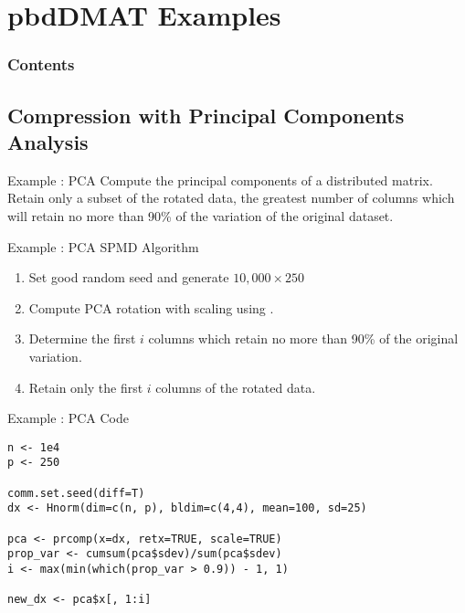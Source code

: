 \section[pbdDMAT Eg's]{pbdDMAT Examples}

\hidenum
\begin{frame}[noframenumbering]
\frametitle{Contents}
 \tableofcontents[currentsection,hideothersubsections,sectionstyle=show/hide]
\end{frame}
\shownum

\subsection{Compression with Principal Components Analysis}

\setcounter{excount}{0}

\begin{frame}
  \begin{block}{Example \countex :  PCA}\pause
    Compute the principal components of a distributed matrix.  Retain only a subset of the rotated data, the greatest number of columns which will retain no more than 90\% of the variation of the original dataset.
  \end{block}
\end{frame}

\begin{frame}[fragile]
  \begin{block}{Example \showex :  PCA SPMD Algorithm}\pause
    \begin{enumerate}
     \item Set good random seed and generate $10,000\times 250$ 
     \item Compute PCA rotation with scaling using .
     \item Determine the first $i$ columns which retain no more than 90\% of the original variation.
     \item Retain only the first $i$ columns of the rotated data.
    \end{enumerate}
  \end{block}
\end{frame}


\begin{frame}[fragile]
  \begin{exampleblock}{Example \showex :  PCA Code}\pause
\begin{lstlisting}
n <- 1e4
p <- 250

comm.set.seed(diff=T)
dx <- Hnorm(dim=c(n, p), bldim=c(4,4), mean=100, sd=25)

pca <- prcomp(x=dx, retx=TRUE, scale=TRUE)
prop_var <- cumsum(pca$sdev)/sum(pca$sdev)
i <- max(min(which(prop_var > 0.9)) - 1, 1)

new_dx <- pca$x[, 1:i]
\end{lstlisting}
  \end{exampleblock}
\end{frame}



